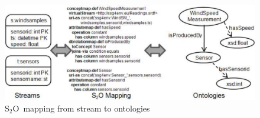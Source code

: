 \documentclass[runningheads,a4paper]{llncs}
\newcommand{\subscript}[1]{\ensuremath{_{\textrm{#1}}}}
\newcommand{\stwoo}{\textsf{S\subscript{2}O}}
\begin{document}
\begin{figure}[here]
\vspace{-20pt} \hspace{20pt}
\includegraphics[width=12 cm]{img/mapping}
\vspace{-10pt} \caption{\stwoo\ mapping from stream to ontologies} \label{fig:Mappings} \vspace{-10pt}
\end{figure}
\end{document}
